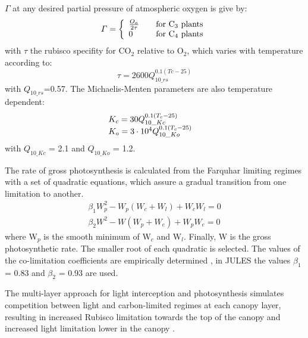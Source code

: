 \documentclass[twoside,10pt]{report}
\begin{document}
$\varGamma$ at any desired partial pressure of atmospheric oxygen is give by:
\begin{equation}\label{eq:gamma_ju}
  \varGamma = \left\{
  \begin{array}{l l}
     \frac{O_a}{2 \tau} & \quad \textrm{for C$_3$ plants}\\
      0  & 
     \quad \textrm {for C$_4$ plants}
  \end{array}\right.
 \end{equation}
\noindent with $\tau$ the rubisco specifity for CO$_2$ relative to O$_2$, which varies with temperature according to:
\begin{equation}
 \tau = 2600 Q_{10{\_}rs}^{0.1(Tc-25)}
\end{equation}
\noindent with $Q_{10{\_}rs}$=0.57.
The Michaelis-Menten parameters are also temperature dependent:
\begin{equation}
\begin{array}{l l}
K_c = 30Q_{10{\_}Kc}^{0.1(T_c-25)} & \\
K_o = 3 \cdot 10^{4} Q_{10{\_}Ko}^{0.1(T_c-25)} &
\end{array}
\end{equation}
\noindent with $Q_{10{\_}Kc}$ = 2.1 and $Q_{10{\_}Ko}$ = 1.2.

The rate of gross photosynthesis is calculated from the Farquhar limiting regimes with a set of quadratic equations, which assure a gradual transition from one limitation to another. 
\begin{equation}\label{quadratic}
\begin{split}
\beta_1 W_p^2-W_p(W_c+W_l)+W_cW_l=0 \\
\beta_2 W^2-W(W_p+W_e)+W_pW_e=0
\end{split}
\end{equation}
\noindent where W$_p$ is the smooth minimum of W$_c$ and W$_l$. Finally, W is the gross photosynthetic rate. The smaller root of each quadratic is selected. The values of the co-limitation coefficients are empirically determined \citep{Collatz1990}, in JULES the values $\beta_1$ = 0.83 and $\beta_2$ = 0.93 are used. 

The multi-layer approach for light interception and photosynthesis simulates competition between light and carbon-limited regimes at each canopy layer, resulting
in increased Rubisco limitation towards the top of the canopy and increased light limitation lower in the canopy \citep{Clark2011}.
\end{document}
